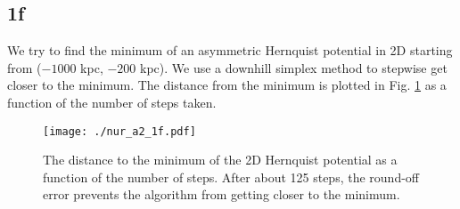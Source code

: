 



\subsection{1f}



We try to find the minimum of an asymmetric Hernquist potential in 2D starting from ($-1000$ kpc, $-200$ kpc). We use a downhill simplex method to stepwise get closer to the minimum. The distance from the minimum is plotted in Fig. \ref{fig:1f} as a function of the number of steps taken.

\newpage

\begin{figure}[!ht]
  \centering
  \texttt{[image: ./nur\_a2\_1f.pdf]}
  \caption{The distance to the minimum of the 2D Hernquist potential as a function of the number of steps. After about 125 steps, the round-off error prevents the algorithm from getting closer to the minimum.}
  \label{fig:1f}
\end{figure}

\newpage

